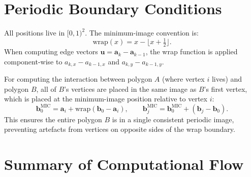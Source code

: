 \documentclass[12pt]{article}
\begin{document}
\section{Periodic Boundary Conditions}

All positions live in $[0,1)^2$.  The minimum-image convention is:
\[
  \mathrm{wrap}(x) = x - \lfloor x + \tfrac{1}{2}\rfloor.
\]
When computing edge vectors $\mathbf{u} = \mathbf{a}_k - \mathbf{a}_{k-1}$,
the wrap function is applied component-wise to $a_{k,x} - a_{k-1,x}$ and
$a_{k,y} - a_{k-1,y}$.

For computing the interaction between polygon $A$ (where vertex $i$ lives)
and polygon $B$, all of $B$'s vertices are placed in the same image as $B$'s
first vertex, which is placed at the minimum-image position relative to vertex $i$:
\[
  \mathbf{b}_0^{\mathrm{MIC}} = \mathbf{a}_i + \mathrm{wrap}(\mathbf{b}_0 - \mathbf{a}_i),
  \qquad \mathbf{b}_j^{\mathrm{MIC}} = \mathbf{b}_0^{\mathrm{MIC}} + (\mathbf{b}_j - \mathbf{b}_0).
\]
This ensures the entire polygon $B$ is in a single consistent periodic image, preventing
artefacts from vertices on opposite sides of the wrap boundary.

\section{Summary of Computational Flow}
\end{document}
